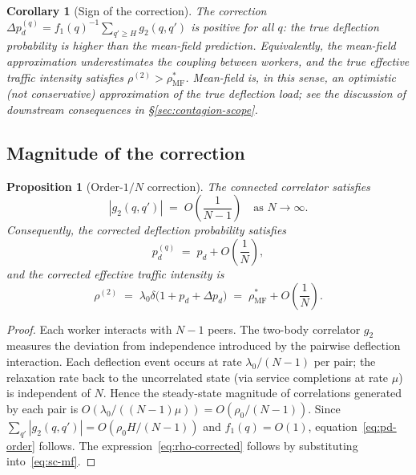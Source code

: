 \documentclass[11pt,a4paper]{report}
\newtheorem{proposition}[theorem]{Proposition}
\newtheorem{corollary}[theorem]{Corollary}
\newcommand{\abs}[1]{\left\lvert #1 \right\rvert}
\newcommand{\rhostar}{\rho^{*}}
\newcommand{\pd}{p_d}
\newcommand{\fone}{f_1}
\newcommand{\gtwo}{g_2}
\begin{document}
\begin{corollary}[Sign of the correction]
The correction $\Delta\pd^{(q)} = \fone(q)^{-1} \sum_{q' \geq H} \gtwo(q, q')$
is \emph{positive} for all $q$: the true deflection probability is
\emph{higher} than the mean-field prediction.
Equivalently, the mean-field approximation \emph{underestimates} the
coupling between workers, and the true effective traffic intensity
satisfies $\rho^{(2)} > \rhostar_{\mathrm{MF}}$. Mean-field is, in this
sense, an \emph{optimistic} (not conservative) approximation of the
true deflection load; see the discussion of downstream consequences in
\S\ref{sec:contagion-scope}.
\end{corollary}

\subsection{Magnitude of the correction}

\begin{proposition}[Order-$1/N$ correction]
\label{prop:1overN}
The connected correlator satisfies
\begin{equation}
  \abs{\gtwo(q, q')} \;=\; O\!\left(\frac{1}{N-1}\right)
  \quad \text{as } N \to \infty.
\end{equation}
Consequently, the corrected deflection probability satisfies
\begin{equation}
  \pd^{(q)} \;=\; \pd + O\!\left(\frac{1}{N}\right),
  \label{eq:pd-order}
\end{equation}
and the corrected effective traffic intensity is
\begin{equation}
  \rho^{(2)}
  \;=\; \lambda_0\delta\bigl(1 + \pd + \Delta\pd\bigr)
  \;=\; \rhostar_{\mathrm{MF}} + O\!\left(\frac{1}{N}\right).
  \label{eq:rho-corrected}
\end{equation}
\end{proposition}

\begin{proof}
Each worker interacts with $N-1$ peers.  The two-body correlator $\gtwo$
measures the deviation from independence introduced by the pairwise
deflection interaction.  Each deflection event occurs at rate
$\lambda_0/(N-1)$ per pair; the relaxation rate back to the uncorrelated
state (via service completions at rate $\mu$) is independent of $N$.
Hence the steady-state magnitude of correlations generated by each pair is
$O(\lambda_0/((N-1)\mu)) = O(\rho_0/(N-1))$.
Since $\sum_{q'} \abs{\gtwo(q, q')} = O(\rho_0 H / (N-1))$ and
$\fone(q) = O(1)$, equation~\eqref{eq:pd-order} follows.
The expression~\eqref{eq:rho-corrected} follows by substituting
into~\eqref{eq:sc-mf}.
\end{proof}
\end{document}
